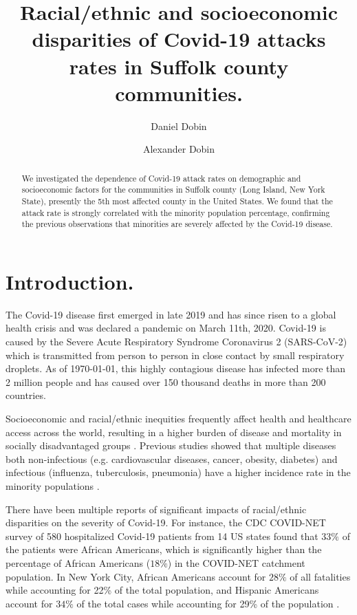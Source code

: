 \documentclass[twoside,12pt,onecolumn]{article}
\title{Racial/ethnic and socioeconomic disparities of Covid-19 attacks rates in Suffolk county communities.}
\author[1]{Daniel Dobin}
\author[2]{Alexander Dobin}
\affil[1]{Candlewood Middle School, New York, USA}
\affil[2]{Cold Spring Harbor Laboratory, New York, USA}
\date{}
\begin{document}
\maketitle

\begin{abstract}
We investigated the dependence of Covid-19 attack rates on demographic and socioeconomic factors for the communities in Suffolk county (Long Island, New York State), presently the 5th most affected county in the United States. We found that the attack rate is strongly correlated with the minority population percentage, confirming the previous observations that minorities are severely affected by the Covid-19 disease.
\end{abstract}

\section{Introduction.}
The Covid-19 disease first emerged in late 2019 and has since risen to a global health crisis and was declared a pandemic on March 11th, 2020. Covid-19 is caused by the Severe Acute Respiratory Syndrome Coronavirus 2 (SARS-CoV-2) which is transmitted from person to person in close contact by small respiratory droplets. As of \today, this highly contagious disease has infected more than 2 million people and has caused over 150 thousand deaths in more than 200 countries.

Socioeconomic and racial/ethnic inequities frequently affect health and healthcare access across the world, resulting in a higher burden of disease and mortality in socially disadvantaged groups \cite{Braveman2010,Flores2010,Nesbitt2016,Williams2016}.
Previous studies showed that multiple diseases both non-infectious (e.g. cardiovascular diseases, cancer, obesity, diabetes) and infectious (influenza, tuberculosis, pneumonia) have a higher incidence rate in the minority populations \cite{Graham_heartDispar_2015,Ozdemir_cancerDispar_2017,Bhupathiraju_obesityDiabetes_2016,Quinn_influenza_2011,_tuberculosis_2004,Burton_pneumonia_2010}.

There have been multiple reports of significant impacts of racial/ethnic disparities on the severity of Covid-19. For instance, the CDC COVID-NET survey of 580 hospitalized Covid-19 patients from 14 US states \cite{COVID-NET_2020} found that $33\%$ of the patients were African Americans, which is significantly higher than the  percentage of African Americans ($18\%$) in the COVID-NET catchment population. In New York City, African Americans account for $28\%$ of all fatalities while accounting for 22\% of the total population, and Hispanic Americans account for $34\%$ of the total cases while accounting for 29\% of the population \cite{NYS_COVID19_tracker} .
\end{document}
